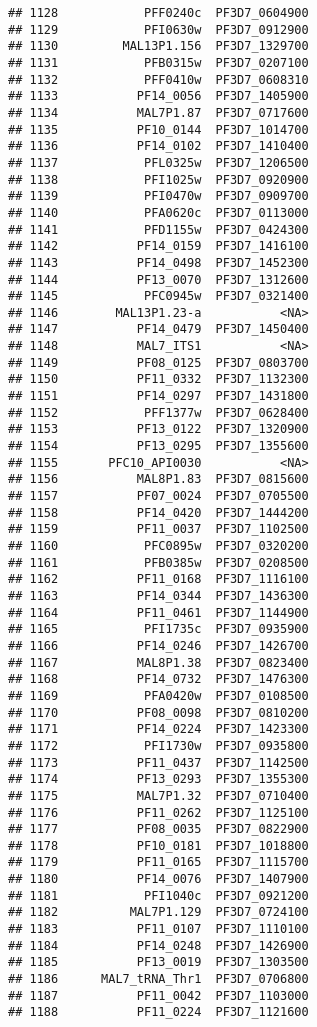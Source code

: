 \documentclass[12pt, a4paper]{article}\usepackage[]{graphicx}\usepackage[]{color}
\makeatletter
\newenvironment{kframe}{%
 \def\at@end@of@kframe{}%
 \ifinner\ifhmode%
  \def\at@end@of@kframe{\end{minipage}}%
  \begin{minipage}{\columnwidth}%
 \fi\fi%
 \def\FrameCommand##1{\hskip\@totalleftmargin \hskip-\fboxsep
 \colorbox{shadecolor}{##1}\hskip-\fboxsep
     \hskip-\linewidth \hskip-\@totalleftmargin \hskip\columnwidth}%
 \MakeFramed {\advance\hsize-\width
   \@totalleftmargin\z@ \linewidth\hsize
   \@setminipage}}%
 {\par\unskip\endMakeFramed%
 \at@end@of@kframe}
\newenvironment{knitrout}{}{} %
\makeatother
\begin{document}
\begin{knitrout}
\begin{kframe}
\begin{verbatim}
## 1128            PFF0240c  PF3D7_0604900
## 1129            PFI0630w  PF3D7_0912900
## 1130         MAL13P1.156  PF3D7_1329700
## 1131            PFB0315w  PF3D7_0207100
## 1132            PFF0410w  PF3D7_0608310
## 1133           PF14_0056  PF3D7_1405900
## 1134           MAL7P1.87  PF3D7_0717600
## 1135           PF10_0144  PF3D7_1014700
## 1136           PF14_0102  PF3D7_1410400
## 1137            PFL0325w  PF3D7_1206500
## 1138            PFI1025w  PF3D7_0920900
## 1139            PFI0470w  PF3D7_0909700
## 1140            PFA0620c  PF3D7_0113000
## 1141            PFD1155w  PF3D7_0424300
## 1142           PF14_0159  PF3D7_1416100
## 1143           PF14_0498  PF3D7_1452300
## 1144           PF13_0070  PF3D7_1312600
## 1145            PFC0945w  PF3D7_0321400
## 1146        MAL13P1.23-a           <NA>
## 1147           PF14_0479  PF3D7_1450400
## 1148           MAL7_ITS1           <NA>
## 1149           PF08_0125  PF3D7_0803700
## 1150           PF11_0332  PF3D7_1132300
## 1151           PF14_0297  PF3D7_1431800
## 1152            PFF1377w  PF3D7_0628400
## 1153           PF13_0122  PF3D7_1320900
## 1154           PF13_0295  PF3D7_1355600
## 1155       PFC10_API0030           <NA>
## 1156           MAL8P1.83  PF3D7_0815600
## 1157           PF07_0024  PF3D7_0705500
## 1158           PF14_0420  PF3D7_1444200
## 1159           PF11_0037  PF3D7_1102500
## 1160            PFC0895w  PF3D7_0320200
## 1161            PFB0385w  PF3D7_0208500
## 1162           PF11_0168  PF3D7_1116100
## 1163           PF14_0344  PF3D7_1436300
## 1164           PF11_0461  PF3D7_1144900
## 1165            PFI1735c  PF3D7_0935900
## 1166           PF14_0246  PF3D7_1426700
## 1167           MAL8P1.38  PF3D7_0823400
## 1168           PF14_0732  PF3D7_1476300
## 1169            PFA0420w  PF3D7_0108500
## 1170           PF08_0098  PF3D7_0810200
## 1171           PF14_0224  PF3D7_1423300
## 1172            PFI1730w  PF3D7_0935800
## 1173           PF11_0437  PF3D7_1142500
## 1174           PF13_0293  PF3D7_1355300
## 1175           MAL7P1.32  PF3D7_0710400
## 1176           PF11_0262  PF3D7_1125100
## 1177           PF08_0035  PF3D7_0822900
## 1178           PF10_0181  PF3D7_1018800
## 1179           PF11_0165  PF3D7_1115700
## 1180           PF14_0076  PF3D7_1407900
## 1181            PFI1040c  PF3D7_0921200
## 1182          MAL7P1.129  PF3D7_0724100
## 1183           PF11_0107  PF3D7_1110100
## 1184           PF14_0248  PF3D7_1426900
## 1185           PF13_0019  PF3D7_1303500
## 1186      MAL7_tRNA_Thr1  PF3D7_0706800
## 1187           PF11_0042  PF3D7_1103000
## 1188           PF11_0224  PF3D7_1121600

\end{verbatim}
\end{kframe}
\end{knitrout}
\end{document}
